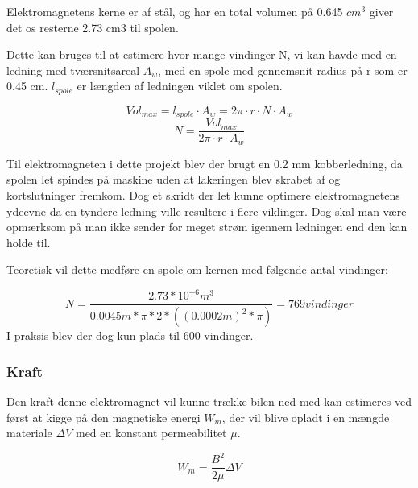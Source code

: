 Elektromagnetens kerne er af stål, og har en total volumen på 0.645 $cm^3$ giver det os resterne 2.73 cm3 til spolen.

Dette kan bruges til at estimere hvor mange vindinger N, vi kan havde med en ledning med tværsnitsareal $A_w$, med en spole med gennemsnit radius på r som er 0.45 cm.  $l_{spole}$ er længden af ledningen viklet om spolen.

\begin{equation}
Vol_{max} =l_{spole} \cdot A_w = 2\pi \cdot r \cdot N \cdot A_w
\end{equation}
\begin{equation}
N= \frac{Vol_{max}}{2\pi \cdot r \cdot A_w}
\end{equation}

Til elektromagneten i dette projekt blev der brugt en 0.2 mm kobberledning, da spolen let spindes på maskine uden at lakeringen blev skrabet af og kortslutninger fremkom. Dog et skridt der let kunne optimere elektromagnetens ydeevne da en tyndere ledning ville resultere i flere viklinger. Dog skal man være opmærksom på man ikke sender for meget strøm igennem ledningen end den kan holde til.

Teoretisk vil dette medføre en spole om kernen med følgende antal vindinger:

\begin{equation}
N=\frac{2.73*10^{-6} m^3}{0.0045m*\pi*2*((0.0002m)^{2}*\pi)} = 769 vindinger
\end{equation}
I praksis blev der dog kun plads til 600 vindinger.

\subsubsection{Kraft}

Den kraft denne elektromagnet vil kunne trække bilen ned med kan estimeres ved først at kigge på den magnetiske energi $W_m$, der vil blive opladt i en mængde materiale $ \Delta V$ med en konstant permeabilitet $ \mu $.

\begin{equation}
W_m =\frac{B^2}{2 \mu} \Delta V
\end{equation}

